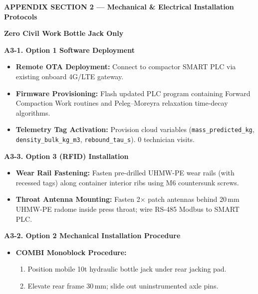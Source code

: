 \documentclass[10pt,a4paper]{article}
\newcommand{\conceptbanner}[5]{%
  \begin{tcolorbox}[colback=bannergray, colframe=bordergray, arc=3pt, leftrule=4pt, boxsep=1pt, left=6pt, right=6pt, top=3pt, bottom=3pt, borderline west={3.5pt}{0pt}{#1}]
    \begin{minipage}[c]{0.56\textwidth}
      {\fontsize{8pt}{9.5pt}\selectfont \textbf{\color{europressdark}#2}}
    \end{minipage}%
    \hfill
    \begin{minipage}[c]{0.42\textwidth}
      \raggedleft
      \colorbox{#3}{\fontsize{6pt}{7pt}\selectfont\color{white}\textbf{#4}} \hspace{1pt}
      \colorbox{europressdark}{\fontsize{6pt}{7pt}\selectfont\color{white}\textbf{#5}}
    \end{minipage}
  \end{tcolorbox}
  \vspace{-3pt}
}
\begin{document}
\conceptbanner{techblue}{APPENDIX SECTION 2 --- Mechanical \& Electrical Installation Protocols}{techblue}{Zero Civil Work}{Bottle Jack Only}

\begin{tcolorbox}[colback=white, colframe=bordergray, arc=3pt, boxsep=2pt, left=5pt, right=5pt, top=3pt, bottom=3pt]
\begin{minipage}[t]{0.48\textwidth}
  {\fontsize{7.2pt}{8.2pt}\selectfont \textbf{\color{techblue}A3-1. Option 1 Software Deployment}}
  {\fontsize{6.8pt}{8.2pt}\selectfont
  \begin{itemize}
    \item \textbf{Remote OTA Deployment:} Connect to compactor SMART PLC via existing onboard 4G/LTE gateway.
    \item \textbf{Firmware Provisioning:} Flash updated PLC program containing Forward Compaction Work routines and Peleg--Moreyra relaxation time-decay algorithms.
    \item \textbf{Telemetry Tag Activation:} Provision cloud variables (\texttt{mass\_predicted\_kg}, \texttt{density\_bulk\_kg\_m3}, \texttt{rebound\_tau\_s}). 0 technician visits.
  \end{itemize}
  }
  \vspace{2pt}
  {\fontsize{7.2pt}{8.2pt}\selectfont \textbf{\color{techpurple}A3-3. Option 3 (RFID) Installation}}
  {\fontsize{6.8pt}{8.2pt}\selectfont
  \begin{itemize}
    \item \textbf{Wear Rail Fastening:} Fasten pre-drilled UHMW-PE wear rails (with recessed tags) along container interior ribs using M6 countersunk screws.
    \item \textbf{Throat Antenna Mounting:} Fasten 2$\times$ patch antennas behind 20\,mm UHMW-PE radome inside press throat; wire RS-485 Modbus to SMART PLC.
  \end{itemize}
  }
\end{minipage}%
\hfill
\begin{minipage}[t]{0.48\textwidth}
  {\fontsize{7.2pt}{8.2pt}\selectfont \textbf{\color{europressred}A3-2. Option 2 Mechanical Installation Procedure}}
  {\fontsize{6.8pt}{8.2pt}\selectfont
  \begin{itemize}
    \item \textbf{COMBI Monoblock Procedure:}
      \begin{enumerate}
        \item Position mobile 10t hydraulic bottle jack under rear jacking pad.
        \item Elevate rear frame 30\,mm; slide out uninstrumented axle pins.

\end{enumerate}
\end{itemize}}
\end{minipage}
\end{tcolorbox}
\end{document}
